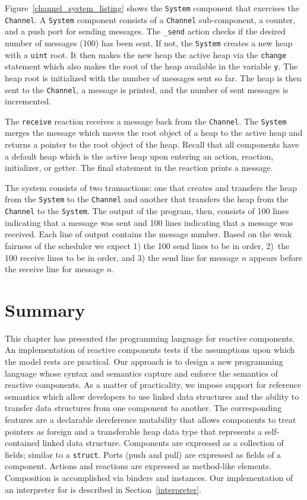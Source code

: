 Figure~\ref{channel_system_listing} shows the \verb+System+ component that exercises the \verb+Channel+.
A \verb+System+ component consists of a \verb+Channel+ sub-component, a counter, and a push port for sending messages.
The \verb+_send+ action checks if the desired number of messages (100) has been sent.
If not, the \verb+System+ creates a new heap with a \verb+uint+ root.
It then makes the new heap the active heap via the \verb+change+ statement which also makes the root of the heap available in the variable \verb+y+.
The heap root is initialized with the number of messages sent so far.
The heap is then sent to the \verb+Channel+, a message is printed, and the number of sent messages is incremented.

The \verb+receive+ reaction receives a message back from the \verb+Channel+.
The \verb+System+ merges the message which moves the root object of a heap to the active heap and returns a pointer to the root object of the heap.
Recall that all components have a default heap which is the active heap upon entering an action, reaction, initializer, or getter.
The final statement in the reaction prints a message.

The system consists of two transactions:  one that creates and transfers the heap from the \verb+System+ to the \verb+Channel+ and another that transfers the heap from the \verb+Channel+ to the \verb+System+.
The output of the program, then, consists of 100 lines indicating that a message was sent and 100 lines indicating that a message was received.
Each line of output contains the message number.
Based on the weak fairness of the scheduler we expect 1) the 100 send lines to be in order, 2)~the 100 receive lines to be in order, and 3) the send line for message $n$ appears before the receive line for message $n$.

\section{Summary}

This chapter has presented the \rcgo programming language for reactive components.
An implementation of reactive components tests if the assumptions upon which the model rests are practical.
Our approach is to design a new programming language whose syntax and semantics  capture and enforce the semantics of reactive components.
As a matter of practicality, we impose support for reference semantics which allow developers to use linked data structures and the ability to transfer data structures from one component to another.
The corresponding features are a declarable dereference mutability that allows components to treat pointers as foreign and a transferable heap data type that represents a self-contained linked data structure.
Components are expressed as a collection of fields; similar to a \verb+struct+.
Ports (push and pull) are expressed as fields of a component.
Actions and reactions are expressed as method-like elements.
Composition is accomplished via binders and instances.
Our implementation of an interpreter for \rcgo is described in Section~\ref{interpreter}.

